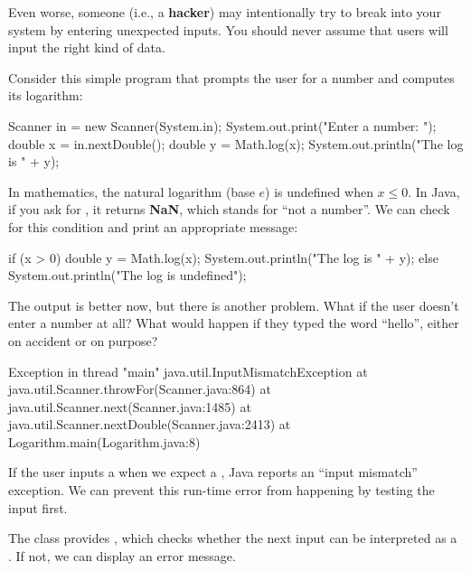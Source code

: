 Even worse, someone (i.e., a {\bf hacker}) may intentionally try to break into your system by entering unexpected inputs.
You should never assume that users will input the right kind of data.

Consider this simple program that prompts the user for a number and computes its logarithm:

\begin{code}
Scanner in = new Scanner(System.in);
System.out.print("Enter a number: ");
double x = in.nextDouble();
double y = Math.log(x);
System.out.println("The log is " + y);
\end{code}

In mathematics, the natural logarithm (base $e$) is undefined when $x \le 0$.
In Java, if you ask for , it returns {\bf NaN}, which stands for ``not a number''.
We can check for this condition and print an appropriate message:

\begin{code}
if (x > 0) {
    double y = Math.log(x);
    System.out.println("The log is " + y);
} else {
    System.out.println("The log is undefined");
}
\end{code}

The output is better now, but there is another problem.
What if the user doesn't enter a number at all?
What would happen if they typed the word ``hello'', either on accident or on purpose?


\begin{small}
\begin{stdout}
Exception in thread "main" java.util.InputMismatchException
    at java.util.Scanner.throwFor(Scanner.java:864)
    at java.util.Scanner.next(Scanner.java:1485)
    at java.util.Scanner.nextDouble(Scanner.java:2413)
    at Logarithm.main(Logarithm.java:8)
\end{stdout}
\end{small}


If the user inputs a  when we expect a , Java reports an ``input mismatch'' exception.
We can prevent this run-time error from happening by testing the input first.

The  class provides , which checks whether the next input can be interpreted as a .
If not, we can display an error message.

